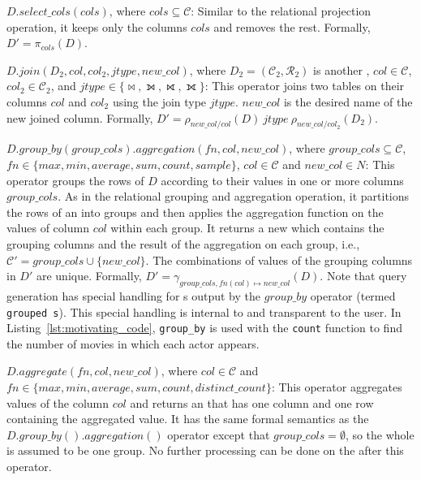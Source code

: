 	\item $D.select\_cols(cols)$, where $cols \subseteq \mathcal{C}$: Similar to the relational projection operation, it keeps only the columns $cols$ and removes the rest. Formally, $D' = \pi_{cols}(D)$.

\begin{sloppypar}
	\item $D.join(D_2, col, col_2, jtype, new\_col)$, where $D_2 = (\mathcal{C}_2, \mathcal{R}_2)$ is another \rdfframe, $col \in \mathcal{C}$, $col_2 \in \mathcal{C}_2$, and $jtype \in \{\Join, \leftouterjoin, \rightouterjoin, \fullouterjoin\}$:
	This operator joins two \rdfframe tables on their columns $col$ and $col_2$ using the join type $jtype$. $new\_col$ is the desired name of the new joined column.
	Formally, $D' = \rho_{new\_col/col} (D)\ jtype\ \rho_{new\_col/col_2}(D_2)$.


	\item $D.group\_by(group\_cols).aggregation(fn, col, new\_col)$, where $group\_cols \subseteq \mathcal{C}$, $fn \in \{max, min, average, sum, count, sample\}$, $col \in \mathcal{C} $ and $new\_col \in N$: This operator groups the rows of $D$ according to their values in one or more columns $group\_cols$. As in the relational grouping and aggregation operation, it partitions the rows of an \rdfframe into 
  groups
  and then applies the aggregation function on the values of column $col$ within each group. It returns a new \rdfframe which contains the grouping columns and the result of the aggregation on each group, i.e., $\mathcal{C'} = group\_cols \cup \{new\_col\}$. The combinations of values of the grouping columns in $D'$ are unique. Formally,
	$D' = \gamma_{group\_cols, fn(col) \mapsto new\_col}(D)$.
	Note that query generation has special handling for {\rdfframe}s output by the $group\_by$ operator (termed \texttt{grouped {\rdfframe}s}).
	This special handling is internal to  \rdfframes and transparent to the user.
  In Listing~\ref{lst:motivating_code}, \texttt{group\_by} is used with the \texttt{count} function to find the number of movies in which each actor appears.%
	\item $D.aggregate(fn, col, new\_col)$, where $col\in\mathcal{C}$ and $fn\in\{max, min, average, sum, count, distinct\_count\}$: This operator aggregates values of the column $col$ and returns an \rdfframe that has one column and one row containing the aggregated value. It has the same formal semantics
  as the $D.group\_by().aggregation()$ operator except that $group\_cols = \emptyset$, so the whole \rdfframe is assumed to be one group.
	No further processing can be done on the \rdfframe after this operator.
\end{sloppypar}

